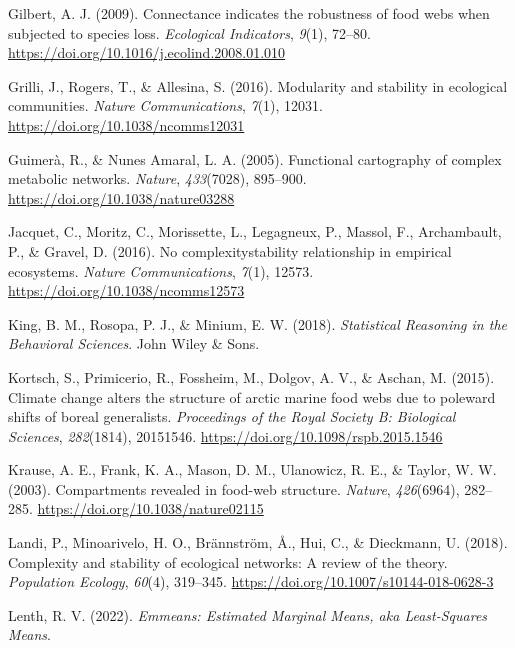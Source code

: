 \documentclass[
]{article}
\newlength{\cslhangindent}
\newlength{\cslentryspacingunit} %
\newenvironment{CSLReferences}[2] %
 {%
  \setlength{\parindent}{0pt}
  \ifodd #1
  \let\oldpar\par
  \def\par{\hangindent=\cslhangindent\oldpar}
  \fi
  \setlength{\parskip}{#2\cslentryspacingunit}
 }%
 {}
\begin{document}
\begin{CSLReferences}{1}{0}
\leavevmode{}%
Gilbert, A. J. (2009). Connectance indicates the robustness of food webs
when subjected to species loss. \emph{Ecological Indicators},
\emph{9}(1), 72--80. \url{https://doi.org/10.1016/j.ecolind.2008.01.010}

\leavevmode{}%
Grilli, J., Rogers, T., \& Allesina, S. (2016). Modularity and stability
in ecological communities. \emph{Nature Communications}, \emph{7}(1),
12031. \url{https://doi.org/10.1038/ncomms12031}

\leavevmode{}%
Guimerà, R., \& Nunes Amaral, L. A. (2005). Functional cartography of
complex metabolic networks. \emph{Nature}, \emph{433}(7028), 895--900.
\url{https://doi.org/10.1038/nature03288}

\leavevmode{}%
Jacquet, C., Moritz, C., Morissette, L., Legagneux, P., Massol, F.,
Archambault, P., \& Gravel, D. (2016). No
complexity\textendash stability relationship in empirical ecosystems.
\emph{Nature Communications}, \emph{7}(1), 12573.
\url{https://doi.org/10.1038/ncomms12573}

\leavevmode{}%
King, B. M., Rosopa, P. J., \& Minium, E. W. (2018). \emph{Statistical
{Reasoning} in the {Behavioral Sciences}}. {John Wiley \& Sons}.

\leavevmode{}%
Kortsch, S., Primicerio, R., Fossheim, M., Dolgov, A. V., \& Aschan, M.
(2015). Climate change alters the structure of arctic marine food webs
due to poleward shifts of boreal generalists. \emph{Proceedings of the
Royal Society B: Biological Sciences}, \emph{282}(1814), 20151546.
\url{https://doi.org/10.1098/rspb.2015.1546}

\leavevmode{}%
Krause, A. E., Frank, K. A., Mason, D. M., Ulanowicz, R. E., \& Taylor,
W. W. (2003). Compartments revealed in food-web structure.
\emph{Nature}, \emph{426}(6964), 282--285.
\url{https://doi.org/10.1038/nature02115}

\leavevmode{}%
Landi, P., Minoarivelo, H. O., Brännström, Å., Hui, C., \& Dieckmann, U.
(2018). Complexity and stability of ecological networks: A review of the
theory. \emph{Population Ecology}, \emph{60}(4), 319--345.
\url{https://doi.org/10.1007/s10144-018-0628-3}

\leavevmode{}%
Lenth, R. V. (2022). \emph{Emmeans: {Estimated Marginal Means}, aka
{Least-Squares Means}}.


\end{CSLReferences}
\end{document}
